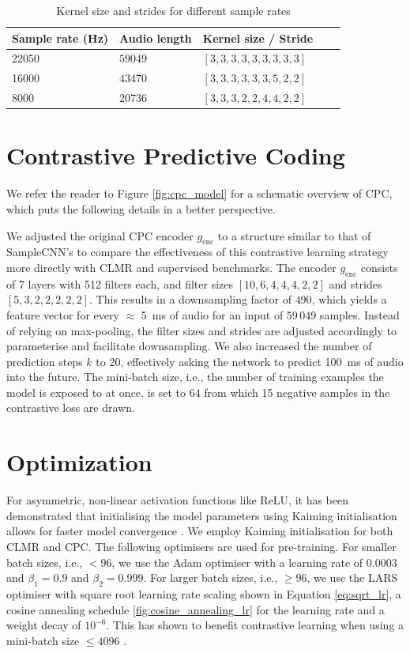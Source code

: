 \begin{table}
    \centering
        \begin{tabular}{lllll}\toprule
        Sample rate (Hz) & Audio length & Kernel size / Stride & \\\midrule
        22050 & $59049$  & $[3, 3, 3, 3, 3, 3, 3, 3, 3]$ \\
        16000 & $43470$ & $[3, 3, 3, 3, 3, 3, 5, 2, 2]$ \\
        8000 & $20736$ & $[3, 3, 3, 2, 2, 4, 4, 2, 2]$ \\                       
        \bottomrule
        \end{tabular}
    \caption{Kernel size and strides for different sample rates}
    \label{tab:samplecnn_config}
\end{table}

\section{Contrastive Predictive Coding}
We refer the reader to Figure \ref{fig:cpc_model} for a schematic overview of CPC, which puts the following details in a better perspective.

We adjusted the original CPC encoder $g_{\mathrm{enc}}$ to a structure similar to that of SampleCNN's to compare the effectiveness of this contrastive learning strategy more directly with CLMR and supervised benchmarks.
The encoder $g_{\mathrm{enc}}$ consists of 7 layers with 512 filters each, and filter sizes $[10, 6, 4, 4, 4, 2, 2]$ and strides $[5, 3, 2, 2, 2, 2, 2]$.
This results in a downsampling factor of $490$, which yields a feature vector for every $\approx$ 5~ms of audio for an input of 59\,049 samples.
Instead of relying on max-pooling, the filter sizes and strides are adjusted accordingly to parameterise and facilitate downsampling.
We also increased the number of prediction steps $k$ to 20, effectively asking the network to predict 100~ms of audio into the future.
The mini-batch size, i.e., the number of training examples the model is exposed to at once, is set to 64 from which 15 negative samples in the contrastive loss are drawn.

\section{Optimization}
For asymmetric, non-linear activation functions like ReLU, it has been demonstrated that initialising the model parameters using Kaiming initialisation allows for faster model convergence \cite{he2015delving}.
We employ Kaiming initialisation for both CLMR and CPC. The following optimisers are used for pre-training. For smaller batch sizes, i.e., $< 96$, we use the Adam optimiser with a learning rate of $0.0003$ and $\beta_1 = 0.9$ and $\beta_2 = 0.999$. 
For larger batch sizes, i.e., $\geq 96$, we use the LARS optimiser with  square root learning rate scaling shown in Equation \ref{eq:sqrt_lr}, a cosine annealing schedule \ref{fig:cosine_annealing_lr} for the learning rate and a weight decay of $10^{-6}$.
This has shown to benefit contrastive learning when using a mini-batch size $\leq 4096$ \cite{chen_simple_2020}.

